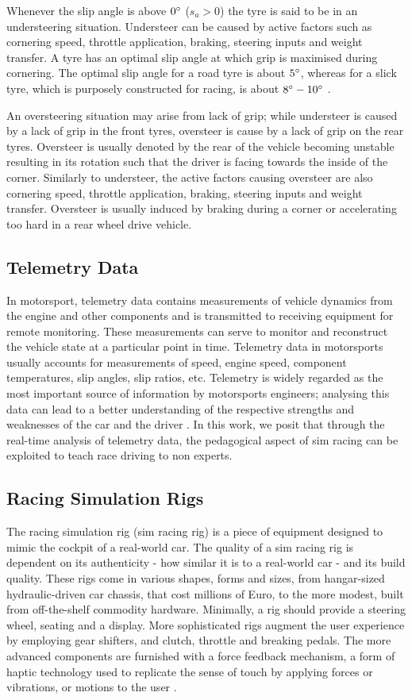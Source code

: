 \documentclass{sig-alternate}
\begin{document}
{Whenever the slip angle is above $0\degree$ ($s_a > 0$) the tyre is said to be in an understeering situation. Understeer can be caused by active factors such as cornering speed, throttle application, braking, steering inputs and weight transfer. A tyre has an optimal slip angle at which grip is maximised during cornering. The optimal slip angle for a road tyre is about $5\degree$, whereas for a slick tyre, which is purposely constructed for racing, is about $8\degree-10\degree$ \cite{beckman1991physics}.

An oversteering situation may arise from lack of grip; while understeer is caused by a lack of grip in the front tyres, oversteer is cause by a lack of grip on the rear tyres. Oversteer is usually denoted by the rear of the vehicle becoming unstable resulting in its rotation such that the driver is facing towards the inside of the corner. Similarly to understeer, the active factors causing oversteer are also cornering speed, throttle application, braking, steering inputs and weight transfer. Oversteer is usually induced by braking during a corner or accelerating too hard in a rear wheel drive vehicle.

\subsection{Telemetry Data}
In motorsport, telemetry data contains measurements of vehicle dynamics from the engine and other components and is transmitted to receiving equipment for remote monitoring. These measurements can serve to monitor and reconstruct the vehicle state at a particular point in time. Telemetry data in motorsports usually accounts for measurements of speed, engine speed, component temperatures, slip angles, slip ratios, etc. Telemetry is widely regarded as the most important source of information by motorsports engineers; analysing this data can lead to a better understanding of the respective strengths and weaknesses of the car and the driver \cite{CarDataAnalysis}. In this work, we posit that through the real-time analysis of telemetry data, the pedagogical aspect of sim racing can be exploited to teach race driving to non experts.

\subsection{Racing Simulation Rigs}
The racing simulation rig (sim racing rig) is a piece of equipment designed to mimic the cockpit of a real-world car. The quality of a sim racing rig is dependent on its authenticity - how similar it is to a real-world car - and its build quality. These rigs come in various shapes, forms and sizes, from hangar-sized hydraulic-driven car chassis, that cost millions of Euro, to the more modest, built from off-the-shelf commodity hardware. Minimally, a rig should provide a steering wheel, seating and a display. More sophisticated rigs augment the user experience by employing gear shifters, and clutch, throttle and breaking pedals. The more advanced components are furnished with a force feedback mechanism, a form of haptic technology used to replicate the sense of touch by applying forces or vibrations, or motions to the user \cite{li2015can}.

}
\end{document}
